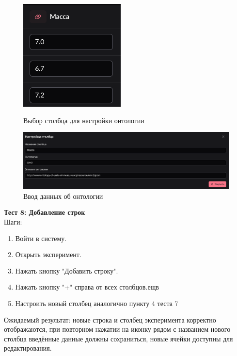 \documentclass[a4paper,12pt,reqno]{article}
\begin{document}
    \begin{figure}[H]
        \centering
        \includegraphics[width=0.5\linewidth]{img/ontology_column_pick.png}
        \caption{Выбор столбца для настройки онтологии}
        \includegraphics[width=\linewidth]{img/ontology_modal.png}
        \caption{Ввод данных об онтологии}
    \end{figure}
    \vspace{0.5cm}
    
    \textbf{Тест 8: Добавление строк}\\
    Шаги:
    \begin{enumerate}
        \item Войти в систему.
        \item Открыть эксперимент.
        \item Нажать кнопку "Добавить строку".
        \item Нажать кнопку "+" справа от всех столбцов.ещв
        \item Настроить новый столбец аналогично пункту 4 теста 7
    \end{enumerate}
    Ожидаемый результат: новые строка и столбец эксперимента корректно отображаются, при повторном нажатии на иконку рядом с названием нового столбца введённые данные должны сохраниться, новые ячейки доступны для редактирования.
\end{document}
